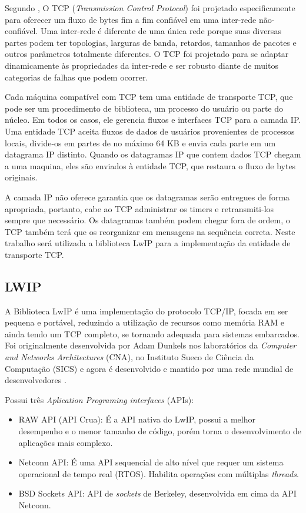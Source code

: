 Segundo , O TCP (\textit{Transmission Control Protocol}) foi projetado especificamente para oferecer um fluxo de bytes fim a fim confiável em uma inter-rede não-confiável. Uma inter-rede é diferente de uma única rede porque suas diversas partes podem ter topologias, larguras de banda, retardos, tamanhos de pacotes e outros parâmetros totalmente diferentes. O TCP foi projetado para se adaptar dinamicamente às propriedades da inter-rede e ser robusto diante de muitos categorias de falhas que podem ocorrer.

Cada máquina compatível com TCP tem uma entidade de transporte TCP, que pode ser um procedimento de biblioteca, um processo do usuário ou parte do núcleo. Em todos os casos, ele gerencia fluxos e interfaces TCP para a camada IP. Uma entidade TCP aceita fluxos de dados de usuários provenientes de processos locais, divide-os em partes de no máximo 64 KB e envia cada parte em um datagrama IP distinto. Quando os datagramas IP que contem dados TCP chegam a uma maquina, eles são enviados à entidade TCP, que restaura o fluxo de bytes originais.

A camada IP não oferece garantia que os datagramas serão entregues de forma apropriada, portanto, cabe ao TCP administrar os timers e retransmiti-los sempre que necessário. Os datagramas também podem chegar fora de ordem, o TCP também terá que os reorganizar em mensagens na sequência correta. Neste trabalho será utilizada a biblioteca LwIP para a implementação da entidade de transporte TCP.

\subsection{LWIP}
A Biblioteca LwIP é uma implementação do protocolo TCP/IP, focada em ser pequena e portável, reduzindo a utilização de recursos como memória RAM e ainda tendo um TCP completo, se tornando adequada para sistemas embarcados. Foi originalmente desenvolvida por Adam Dunkels nos laboratórios da \textit{Computer and Networks Architectures} (CNA), no Instituto Sueco de Ciência da Computação (SICS) e agora é desenvolvido e mantido por uma rede mundial de desenvolvedores \cite{LWIP}.

Possui três \textit{Aplication Programing interfaces} (APIs):
\begin{itemize}
\item RAW API (API Crua): É a API nativa do LwIP, possui a melhor desempenho e o menor tamanho de código, porém torna o desenvolvimento de aplicações mais complexo.
\item Netconn API: É uma API sequencial de alto nível que requer um sistema operacional de tempo real (RTOS). Habilita operações com múltiplas \textit{threads}.
\item BSD Sockets API: API de \textit{sockets} de Berkeley, desenvolvida em cima da API Netconn.
\end{itemize}





